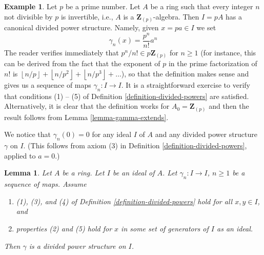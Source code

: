 \documentclass{stacks-project}
\theoremstyle{plain}
\newtheorem{lemma}[subsection]{Lemma}
\theoremstyle{definition}
\newtheorem{example}[subsection]{Example}
\theoremstyle{remark}
\numberwithin{equation}{subsection}
\begin{document}
\begin{example}
\label{example-ideal-generated-by-p}
Let $p$ be a prime number.
Let $A$ be a ring such that every integer $n$ not divisible by $p$
is invertible, i.e., $A$ is a $\mathbf{Z}_{(p)}$-algebra. Then
$I = pA$ has a canonical divided power structure. Namely, given
$x = pa \in I$ we set
$$
\gamma_n(x) = \frac{p^n}{n!} a^n
$$
The reader verifies immediately that $p^n/n! \in p\mathbf{Z}_{(p)}$
for $n \geq 1$ (for instance, this can be derived from the fact
that the exponent of $p$ in the prime factorization of $n!$ is
$\left\lfloor n/p \right\rfloor + \left\lfloor n/p^2 \right\rfloor
+ \left\lfloor n/p^3 \right\rfloor + \ldots$),
so that the definition makes sense and gives us a sequence of
maps $\gamma_n : I \to I$. It is a straightforward exercise to
verify that conditions (1) -- (5) of
Definition \ref{definition-divided-powers} are satisfied.
Alternatively, it is clear that the definition works for
$A_0 = \mathbf{Z}_{(p)}$ and then the result follows from
Lemma \ref{lemma-gamma-extends}.
\end{example}

\noindent
We notice that $\gamma_n\left(0\right) = 0$ for any ideal $I$ of
$A$ and any divided power structure $\gamma$ on $I$. (This follows
from axiom (3) in Definition \ref{definition-divided-powers},
applied to $a=0$.)

\begin{lemma}
\label{lemma-check-on-generators}
Let $A$ be a ring. Let $I$ be an ideal of $A$. Let $\gamma_n : I \to I$,
$n \geq 1$ be a sequence of maps. Assume
\begin{enumerate}
\item[(a)] (1), (3), and (4) of Definition \ref{definition-divided-powers}
hold for all $x, y \in I$, and
\item[(b)] properties (2) and (5) hold for $x$ in
some set of generators of $I$ as an ideal.
\end{enumerate}
Then $\gamma$ is a divided power structure on $I$.
\end{lemma}
\end{document}
